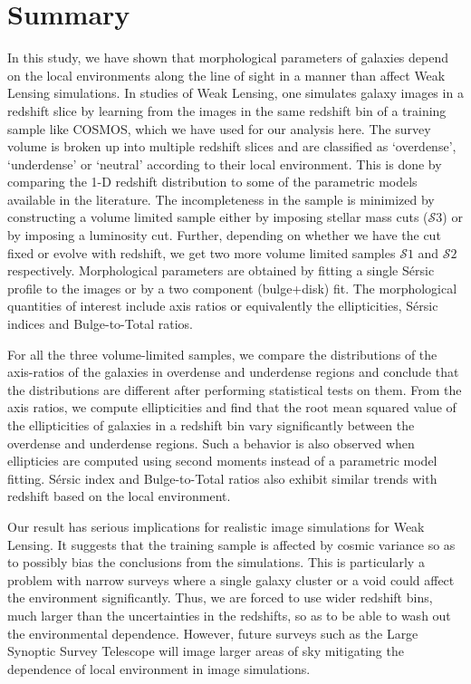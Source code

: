 \documentclass[twocolumn,useAMS,usenatbib]{mn2e}
\newcommand{\sersic}{S\'{e}rsic }
\newcommand{\btt}{Bulge-to-Total }
\newcommand{\s}{\ensuremath{\mathcal{S}}}
\begin{document}
\section{Summary}
\label{S:summary}

In this study, we have shown that morphological parameters of galaxies depend on the local environments along the line of sight in a manner than affect Weak Lensing simulations.
In studies of Weak Lensing, one simulates galaxy images in a redshift slice by learning from the images in the same redshift bin of a training sample like COSMOS, which we have used for our analysis here.
The survey volume is broken up into multiple redshift slices and are classified as `overdense', `underdense' or `neutral' according to their local environment.
This is done by comparing the 1-D redshift distribution to some of the parametric models available in the literature. 
The incompleteness in the sample is minimized by constructing a volume limited sample either by imposing stellar mass cuts (\s$3$) or by imposing a luminosity cut. 
Further, depending on whether we have the cut fixed or evolve with redshift, we get two more volume limited samples \s$1$ and \s$2$ respectively. 
Morphological parameters are obtained by fitting a single \sersic profile to the images or by a two component (bulge+disk) fit. 
The morphological quantities of interest include axis ratios or equivalently the ellipticities, \sersic indices and \btt ratios.

For all the three volume-limited samples, we compare the distributions of the axis-ratios of the galaxies in overdense and underdense regions and conclude that the distributions are different after performing statistical tests on them.
From the axis ratios, we compute ellipticities and find that the root mean squared value of the ellipticities of galaxies in a redshift bin vary significantly between the overdense and underdense regions.
Such a behavior is also observed when ellipticies are computed using second moments instead of a parametric model fitting. \sersic index and \btt ratios also exhibit similar trends
with redshift based on the local environment. 

Our result has serious implications for realistic image simulations for Weak Lensing. 
It suggests that the training sample is affected by cosmic variance so as to possibly bias the conclusions from the simulations. 
This is particularly a problem with narrow surveys where a single galaxy cluster or a void could affect the environment significantly. 
Thus, we are forced to use wider redshift bins, much larger than the uncertainties in the redshifts, so as to be able to wash out the environmental dependence.
However, future surveys such as the Large Synoptic Survey Telescope\citep[LSST;][]{LSST} will image larger areas of sky mitigating the dependence of local environment in image simulations.
\end{document}
